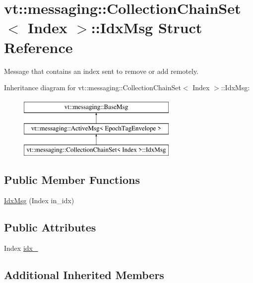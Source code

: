 \hypertarget{structvt_1_1messaging_1_1_collection_chain_set_1_1_idx_msg}{}\section{vt\+:\+:messaging\+:\+:Collection\+Chain\+Set$<$ Index $>$\+:\+:Idx\+Msg Struct Reference}
\label{structvt_1_1messaging_1_1_collection_chain_set_1_1_idx_msg}


Message that contains an index sent to remove or add remotely.  


Inheritance diagram for vt\+:\+:messaging\+:\+:Collection\+Chain\+Set$<$ Index $>$\+:\+:Idx\+Msg\+:\begin{figure}[H]
\begin{center}
\leavevmode
\includegraphics[height=3.000000cm]{structvt_1_1messaging_1_1_collection_chain_set_1_1_idx_msg}
\end{center}
\end{figure}
\subsection*{Public Member Functions}
\begin{DoxyCompactItemize}
\item 
\hyperlink{structvt_1_1messaging_1_1_collection_chain_set_1_1_idx_msg_accf9d441d69bea5546c5a05d8571b8c0}{Idx\+Msg} (Index in\+\_\+idx)
\end{DoxyCompactItemize}
\subsection*{Public Attributes}
\begin{DoxyCompactItemize}
\item 
Index \hyperlink{structvt_1_1messaging_1_1_collection_chain_set_1_1_idx_msg_a789b099b3531df53cfab2794d7c79ba8}{idx\+\_\+}
\end{DoxyCompactItemize}
\subsection*{Additional Inherited Members}


